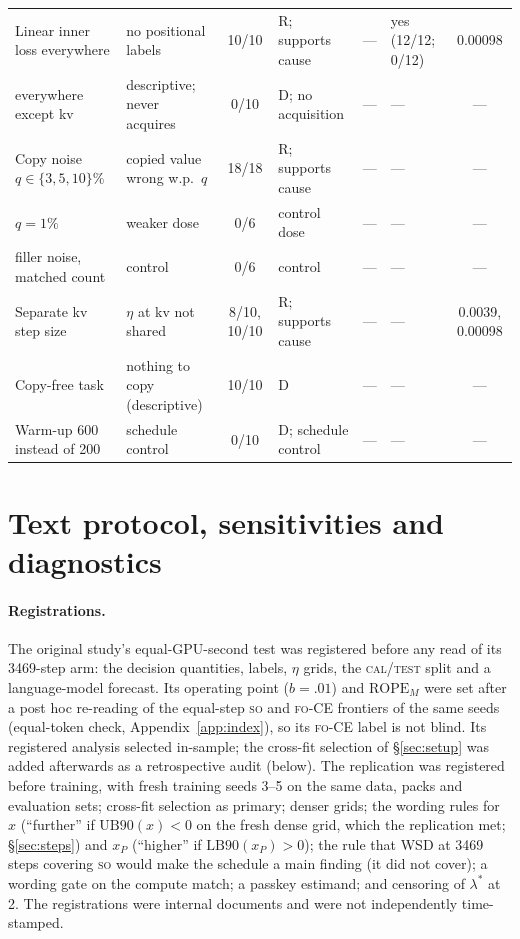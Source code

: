 \documentclass[11pt]{article}
\newcommand{\FO}{\textsc{fo}}
\newcommand{\SO}{\textsc{so}}
\newcommand{\lam}{\ensuremath{\lambda^{\ast}}}
\newcommand{\LB}{\ensuremath{\mathrm{LB90}}}
\newcommand{\UB}{\ensuremath{\mathrm{UB90}}}
\begin{document}
\begin{table}[!htbp]
{\begin{tabular}{@{}L{2.45cm}L{2.25cm}cL{1.45cm}L{1.45cm}L{1.55cm}c@{}}
Linear inner loss everywhere & no positional labels & 10/10 & R; supports cause & --- & yes (12/12; 0/12) & 0.00098 \\
\quad everywhere except kv & descriptive; never acquires & 0/10 & D; no acquisition & --- & --- & --- \\
Copy noise $q\in\{3,5,10\}\%$ & copied value wrong w.p.\ $q$ & 18/18 & R; supports cause & --- & --- & --- \\
\quad $q=1\%$ & weaker dose & 0/6 & control dose & --- & --- & --- \\
\quad filler noise, matched count & control & 0/6 & control & --- & --- & --- \\
Separate kv step size & $\eta$ at kv not shared & 8/10, 10/10 & R; supports cause & --- & --- & 0.0039, 0.00098 \\
\midrule
Copy-free task & nothing to copy (descriptive) & 10/10 & D & --- & --- & --- \\
Warm-up 600 instead of 200 & schedule control & 0/10 & D; schedule control & --- & --- & --- \\
\bottomrule
\end{tabular}}
\end{table}

\FloatBarrier

\section{Text protocol, sensitivities and diagnostics}
\label{app:protocol}

\paragraph{Registrations.} The original study's equal-GPU-second test was registered before any read
of its 3469-step arm: the decision quantities, labels, $\eta$ grids, the \textsc{cal}/\textsc{test}
split and a language-model forecast. Its operating point ($b=.01$) and $\text{ROPE}_M$ were set after a
post hoc re-reading of the equal-step \SO{} and \FO-CE{} frontiers of the same seeds (equal-token check,
Appendix~\ref{app:index}), so its \FO-CE{} label is not blind. Its registered analysis selected in-sample; the cross-fit
selection of \S\ref{sec:setup} was added afterwards as a retrospective audit (below). The replication
was registered before training, with fresh training seeds 3--5 on the same data, packs and evaluation
sets; cross-fit selection as primary; denser grids; the wording rules for $x$ (``further'' if
$\UB(x)<0$ on the fresh dense grid, which the replication met; \S\ref{sec:steps}) and $x_P$
(``higher'' if $\LB(x_P)>0$); the rule that WSD at 3469 steps covering \SO{} would make the schedule a
main finding (it did not cover); a wording gate on the compute match; a passkey estimand; and
censoring of $\lam$ at 2. The registrations were internal documents and were not independently
time-stamped.
\end{document}
